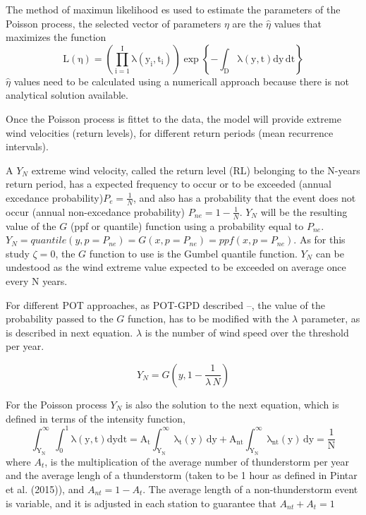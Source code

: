 \documentclass[12pt,twoside]{reedthesis}
\begin{document}
The method of maximun likelihood es used to estimate the parameters of the Poisson process, the selected vector of parameters \(\eta\) are the \(\hat\eta\) values that maximizes the function
\begin{equation}
  \mathrm{
          L(\eta)=\left( 
                        \prod_{i=1}^I\lambda\left(y_i,t_i\right)  
                  \right)
                  \exp\left\{
                            -\int_{{D}}\lambda\left(y,t\right)dy\,dt
                     \right\}
         }
  \label{eq:pplikelihood}
\end{equation}
\(\hat\eta\) values need to be calculated using a numericall approach because there is not analytical solution available.

Once the Poisson process is fittet to the data, the model will provide extreme wind velocities (return levels), for different return periods (mean recurrence intervals).

A \(Y_N\) extreme wind velocity, called the return level (RL) belonging to the N-years return period, has a expected frequency to occur or to be exceeded (annual excedance probability)\(P_e = \frac{1}{N}\), and also has a probability that the event does not occur (annual non-excedance probability) \(P_{ne}=1-\frac{1}{N}\). \(Y_N\) will be the resulting value of the \(G\) (ppf or quantile) function using a probability equal to \(P_{ne}\). \(Y_N=quantile(y, p=P_{ne})=G(x,p=P_{ne})=ppf(x,p=P_{ne})\). As for this study \(\zeta = 0\), the \(G\) function to use is the Gumbel quantile function. \(Y_N\) can be undestood as the wind extreme value expected to be exceeded on average once every N years.

For different POT approaches, as POT-GPD described --, the value of the probability passed to the \(G\) function, has to be modified with the \(\lambda\) parameter, as is described in next equation. \(\lambda\) is the number of wind speed over the threshold per year.

\[
Y_N =G\left(y, 1-\frac{1}{\lambda\,N}\right)
\]

For the Poisson process \(Y_N\) is also the solution to the next equation, which is defined in terms of the intensity function,
\begin{equation}
  \mathrm{
          \int_{Y_N}^{\infty}\int_0^1\lambda\left( y,t\right)dydt = A_t\int_{Y_N}^{\infty}\lambda_t\left( y\right)\,dy + A_{nt}\int_{Y_N}^{\infty}\lambda_{nt}\left( y\right)\,dy = \frac{1}{N}
         }
  \label{eq:ppmri}
\end{equation}
where \(A_t\), is the multiplication of the average number of thunderstorm per year and the average lengh of a thunderstorm (taken to be 1 hour as defined in Pintar et al. (2015)), and \(A_{nt} = 1 - A_t\). The average length of a non-thunderstorm event is variable, and it is adjusted in each station to guarantee that \(A_{nt} + A_t = 1\)
\end{document}

